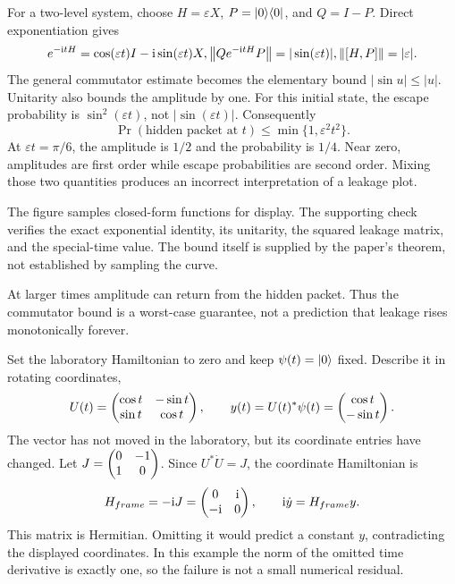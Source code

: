 For a two-level system, choose $H=\varepsilon X$, $P=\lvert 0\rangle\langle 0\rvert$, and $Q=I-P$. Direct exponentiation gives
\[
e^{-\ii tH}=\cos(\varepsilon t)I-\ii\sin(\varepsilon t)X,
\quad
\norm{Qe^{-\ii tH}P}=|\sin(\varepsilon t)|,
\quad\norm{[H,P]}=|\varepsilon|.
\]
The general commutator estimate becomes the elementary bound $|\sin u|\le |u|$. Unitarity also bounds the amplitude by one.
For this initial state, the escape probability is $\sin^2(\varepsilon t)$, not $|\sin(\varepsilon t)|$. Consequently
\[
\Pr(\text{hidden packet at }t)\le\min\{1,\varepsilon^2t^2\}.
\]
At $\varepsilon t=\pi/6$, the amplitude is $1/2$ and the probability is $1/4$. Near zero, amplitudes are first order while escape probabilities are second order. Mixing those two quantities produces an incorrect interpretation of a leakage plot.

The figure samples closed-form functions for display. The supporting check verifies the exact exponential identity, its unitarity, the squared leakage matrix, and the special-time value. The bound itself is supplied by the paper's theorem, not established by sampling the curve.

At larger times amplitude can return from the hidden packet. Thus the commutator bound is a worst-case guarantee, not a prediction that leakage rises monotonically forever.

Set the laboratory Hamiltonian to zero and keep $\psi(t)=\lvert 0\rangle$ fixed. Describe it in rotating coordinates,
\[
U(t)=\begin{pmatrix}\cos t&-\sin t\\\sin t&\cos t\end{pmatrix},
\qquad y(t)=U(t)^*\psi(t)=\begin{pmatrix}\cos t\\-\sin t\end{pmatrix}.
\]
The vector has not moved in the laboratory, but its coordinate entries have changed.
Let $J=\begin{pmatrix}0&-1\\1&0\end{pmatrix}$. Since $U^*\dot U=J$, the coordinate Hamiltonian is
\[
H_{\rm frame}=-\ii J=\mat{0&\ii\\-\ii&0},
\qquad \ii\dot y=H_{\rm frame}y.
\]
This matrix is Hermitian. Omitting it would predict a constant $y$, contradicting the displayed coordinates. In this example the norm of the omitted time derivative is exactly one, so the failure is not a small numerical residual.

